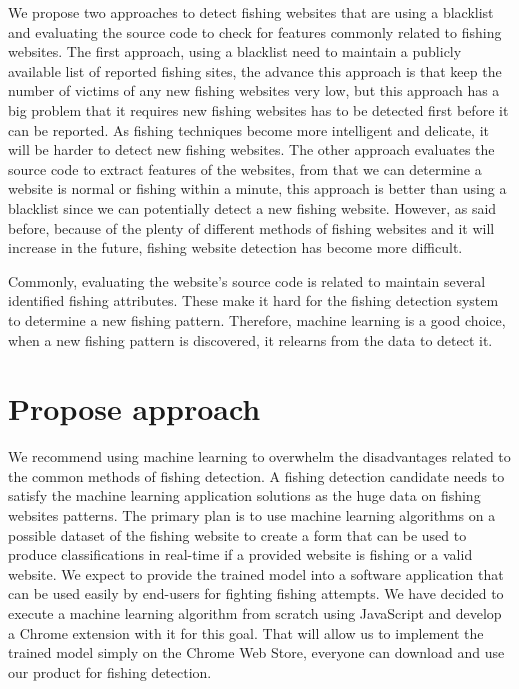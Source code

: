 \documentclass[twocolumn,10pt]{article}
\begin{document}
We propose two approaches to detect fishing websites that are using a blacklist and evaluating the source code to check for features commonly related to fishing websites. The first approach, using a blacklist need to maintain a publicly available list of reported fishing sites, the advance this approach is that keep the number of victims of any new fishing websites very low, but this approach has a big problem that it requires new fishing websites has to be detected first before it can be reported. As fishing techniques become more intelligent and delicate, it will be harder to detect new fishing websites. 	 
The other approach evaluates the source code to extract features of the websites, from that we can determine a website is normal or fishing within a minute, this approach is better than using a blacklist since we can potentially detect a new fishing website. However, as said before, because of the plenty of different methods of fishing websites and it will increase in the future, fishing website detection has become more difficult. 

Commonly, evaluating the website's source code is related to maintain several identified fishing attributes. These make it hard for the fishing detection system to determine a new fishing pattern. Therefore, machine learning is a good choice, when a new fishing pattern is discovered, it relearns from the data to detect it.
\section{Propose approach}

We recommend using machine learning to overwhelm the disadvantages related to the common methods of fishing detection. A fishing detection candidate needs to satisfy the machine learning application solutions as the huge data on fishing websites patterns. The primary plan is to use machine learning algorithms on a possible dataset of the fishing website to create a form that can be used to produce classifications in real-time if a provided website is fishing or a valid website. We expect to provide the trained model into a software application that can be used easily by end-users for fighting fishing attempts. We have decided to execute a machine learning algorithm from scratch using JavaScript and develop a Chrome extension with it for this goal. That will allow us to implement the trained model simply on the Chrome Web Store, everyone can download and use our product for fishing detection. 
\end{document}

